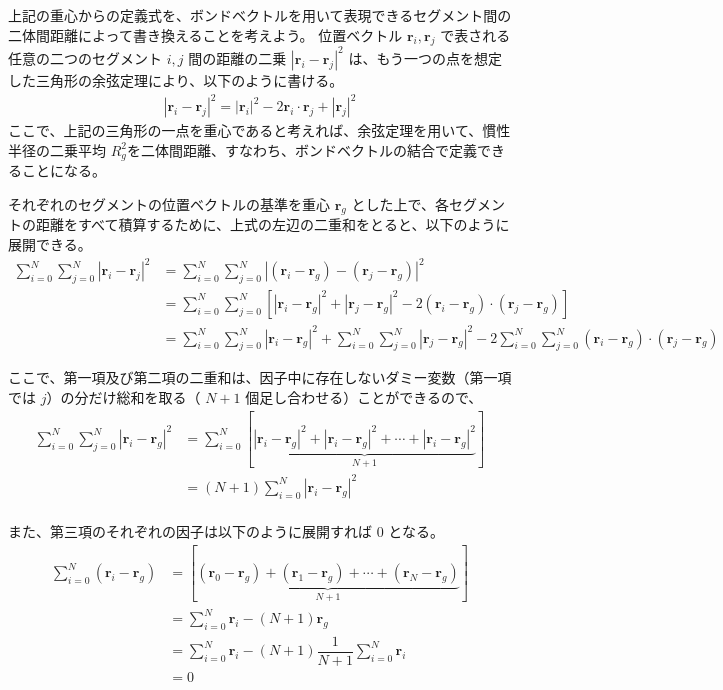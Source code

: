 \documentclass[a4paper,11pt]{ltjsarticle}
\begin{document}
\begin{appendix}
上記の重心からの定義式を、ボンドベクトルを用いて表現できるセグメント間の二体間距離によって書き換えることを考えよう。
位置ベクトル $\bm{r}_{i}, \bm{r}_{j}$ で表される任意の二つのセグメント $i, j$ 間の距離の二乗 $|\bm{r}_{i} - \bm{r}_{j}|^2$ は、もう一つの点を想定した三角形の余弦定理により、以下のように書ける。 
\begin{align*}
|\bm{r}_{i} - \bm{r}_{j}|^2 = |\bm{r}_{i}|^2 - 2 \bm{r}_{i}\cdot\bm{r}_{j} + |\bm{r}_{j}|^2
\end{align*}
ここで、上記の三角形の一点を重心であると考えれば、余弦定理を用いて、慣性半径の二乗平均 $R_g^2$を二体間距離、すなわち、ボンドベクトルの結合で定義できることになる。

それぞれのセグメントの位置ベクトルの基準を重心 $\bm{r}_g$ とした上で、各セグメントの距離をすべて積算するために、上式の左辺の二重和をとると、以下のように展開できる。
\begin{align*}
\sum_{i = 0}^N \sum_{j=0}^N \left| \bm{r}_i - \bm{r}_j \right|^2
	&= \sum_{i = 0}^N \sum_{j=0}^N  \left| (\bm{r}_i - \bm{r}_g) - (\bm{r}_j - \bm{r}_g) \right|^2 \\
	&= \sum_{i = 0}^N \sum_{j=0}^N \left[ \left| \bm{r}_i - \bm{r}_g \right|^2 + \left|\bm{r}_j - \bm{r}_g \right|^2 
		-2 (\bm{r}_i - \bm{r}_g) \cdot (\bm{r}_j - \bm{r}_g) \right] \\
	&= \sum_{i = 0}^N \sum_{j=0}^N \left| \bm{r}_i - \bm{r}_g \right|^2 + \sum_{i = 0}^N \sum_{j=0}^N \left|\bm{r}_j - \bm{r}_g \right|^2 
		-2 \sum_{i = 0}^N \sum_{j=0}^N (\bm{r}_i - \bm{r}_g) \cdot (\bm{r}_j - \bm{r}_g)
\end{align*}

ここで、第一項及び第二項の二重和は、因子中に存在しないダミー変数（第一項では $j$）の分だけ総和を取る（ $N+1$ 個足し合わせる）ことができるので、
\begin{align*}
\sum_{i = 0}^N \sum_{j=0}^N \left| \bm{r}_i - \bm{r}_g \right|^2 
	&= \sum_{i = 0}^N \left[ \underbrace{ \left| \bm{r}_i - \bm{r}_g \right|^2 + \left| \bm{r}_i - \bm{r}_g \right|^2 + \cdots + \left|\bm{r}_i - \bm{r}_g \right|^2 }_{N+1} \right]\\
	&= (N+1) \sum_{i = 0}^N \left| \bm{r}_i - \bm{r}_g \right|^2 \\
\end{align*}

また、第三項のそれぞれの因子は以下のように展開すれば 0 となる。
\begin{align*}
\sum_{i=0}^N (\bm{r}_i - \bm{r}_g) 
	&= \left[ \underbrace{ (\bm{r}_0 - \bm{r}_g) + (\bm{r}_1 - \bm{r}_g) + \cdots + (\bm{r}_N - \bm{r}_g) }_{N+1}\right] \\
	&= \sum_{i=0}^N \bm{r}_i -(N+1) \bm{r}_g \\
	&= \sum_{i=0}^N \bm{r}_i -(N+1) \dfrac{1}{N+1} \sum_{i=0}^{N} \bm{r}_i \\
	&=0
\end{align*}


\end{appendix}
\end{document}

